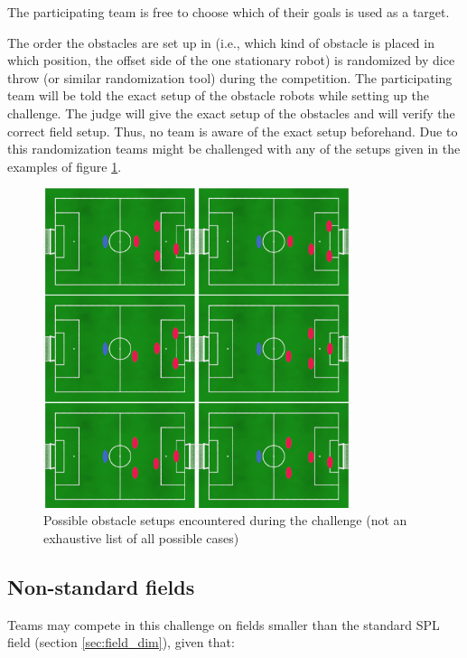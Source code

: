 The participating team is free to choose which of their goals is used as a target.

The order the obstacles are set up in (i.e., which kind of obstacle is placed in which position, the offset side of the one stationary robot) is randomized by dice throw (or similar randomization tool) during the competition. The participating team will be told the exact setup of the obstacle robots while setting up the challenge. The judge will give the exact setup of the obstacles and will verify the correct field setup. Thus, no team is aware of the exact setup beforehand. Due to this randomization teams might be challenged with any of the setups given in the examples of figure \ref{fig:possible_obstacle_setups}.

\begin{figure}[ht]
    \centering
	\includegraphics[width=0.8\textwidth]{figs/obstacle_challenge_2021_a.jpeg}
	\caption{Possible obstacle setups encountered during the challenge (not an exhaustive list of all possible cases)}
	\label{fig:possible_obstacle_setups}
\end{figure}

\subsection{Non-standard fields}
\label{obstacle-non-standard-fields}

Teams may compete in this challenge on fields smaller than the standard SPL field (\cf section \ref{sec:field_dim}), given that:

